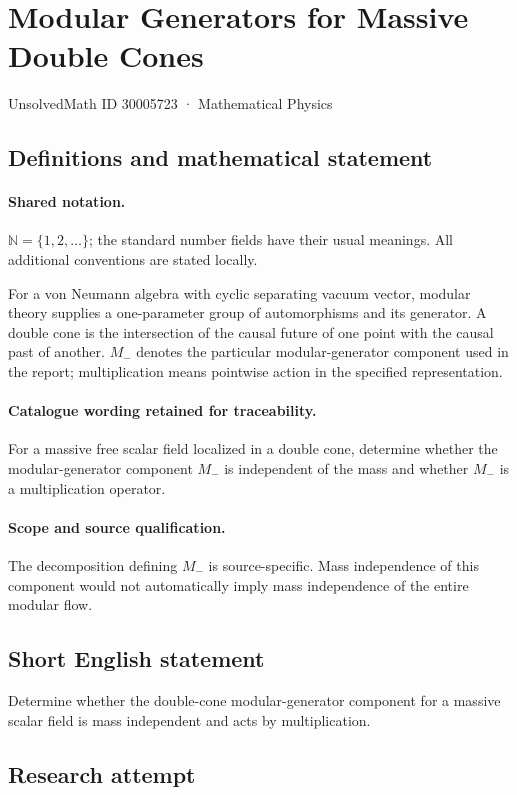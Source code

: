 \documentclass[11pt]{article}
\begin{document}
\setcounter{section}{30005722}
\section{Modular Generators for Massive Double Cones}\label{30005723}
{\small UnsolvedMath ID 30005723 · Mathematical Physics}
\subsection{Definitions and mathematical statement}

\paragraph{Shared notation.}$\mathbb N=\{1,2,\ldots\}$; the standard number fields have their usual meanings. All additional conventions are stated locally.


For a von Neumann algebra with cyclic separating vacuum vector, modular theory supplies a one-parameter group of automorphisms and its generator. A double cone is the intersection of the causal future of one point with the causal past of another. $M_-$ denotes the particular modular-generator component used in the report; multiplication means pointwise action in the specified representation.

\paragraph{Catalogue wording retained for traceability.}
For a massive free scalar field localized in a double cone, determine whether the modular-generator component $M_-$ is independent of the mass and whether $M_-$ is a multiplication operator.

\paragraph{Scope and source qualification.}The decomposition defining $M_-$ is source-specific. Mass independence of this component would not automatically imply mass independence of the entire modular flow.
\subsection{Short English statement}
Determine whether the double-cone modular-generator component for a massive scalar field is mass independent and acts by multiplication.
\subsection{Research attempt}
\end{document}
